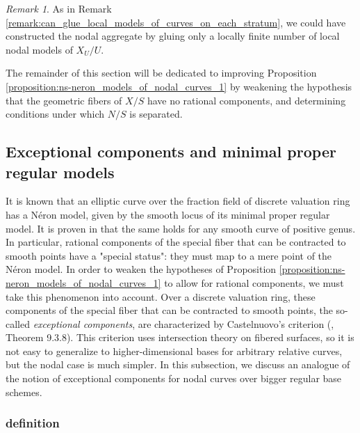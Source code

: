 \documentclass[a4paper,12pt]{amsart} %
\numberwithin{equation}{subsection}
\theoremstyle{definition}
\theoremstyle{plain}%
\theoremstyle{remark}
\newtheorem{remark}[definition]{Remark}
\begin{document}
\begin{remark}
As in Remark \ref{remark:can_glue_local_models_of_curves_on_each_stratum}, we could have constructed the nodal aggregate by gluing only a locally finite number of local nodal models of $X_U/U$.
\end{remark}


The remainder of this section will be dedicated to improving Proposition \ref{proposition:ns-neron_models_of_nodal_curves_1} by weakening the hypothesis that the geometric fibers of $X/S$ have no rational components, and determining conditions under which $N/S$ is separated.


\subsection{Exceptional components and minimal proper regular models}

It is known that an elliptic curve over the fraction field of discrete valuation ring has a N\'eron model, given by the smooth locus of its minimal proper regular model. It is proven in \cite{LiuTong} that the same holds for any smooth curve of positive genus. In particular, rational components of the special fiber that can be contracted to smooth points have a "special status": they must map to a mere point of the N\'eron model. In order to weaken the hypotheses of Proposition \ref{proposition:ns-neron_models_of_nodal_curves_1} to allow for rational components, we must take this phenomenon into account. Over a discrete valuation ring, these components of the special fiber that can be contracted to smooth points, the so-called \emph{exceptional components}, are characterized by Castelnuovo's criterion (\cite{Liu}, Theorem 9.3.8). This criterion uses intersection theory on fibered surfaces, so it is not easy to generalize to higher-dimensional bases for arbitrary relative curves, but the nodal case is much simpler. In this subsection, we discuss an analogue of the notion of exceptional components for nodal curves over bigger regular base schemes.

\subsubsection{definition}
\end{document}
